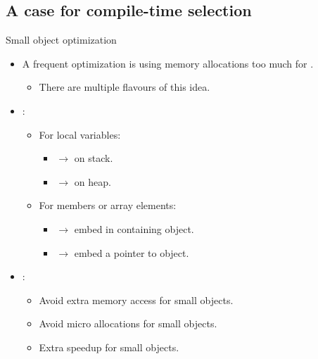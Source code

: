 \subsection{A case for compile-time selection}

\begin{frame}[t,fragile]{Small object optimization}
\begin{itemize}
  \item A frequent optimization is  using memory allocations
        too much for .
    \begin{itemize}
      \item There are multiple flavours of this idea.
    \end{itemize}

  \item {}:
    \begin{itemize}
      \item For local variables:
        \begin{itemize}
          \item {} $\rightarrow$ on stack.
          \item {} $\rightarrow$ on heap.
        \end{itemize}
      \item For members or array elements:
        \begin{itemize}
          \item {} $\rightarrow$ embed in containing object.
          \item {} $\rightarrow$ embed a pointer to object.
        \end{itemize}
    \end{itemize}

  \item {}:
    \begin{itemize}
      \item Avoid extra memory access for small objects.
      \item Avoid micro allocations for small objects.
      \item Extra speedup for small objects.
    \end{itemize}
\end{itemize}
\end{frame}

